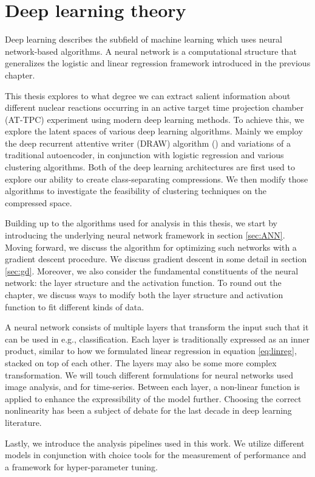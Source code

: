\chapter{Deep learning theory}\label{ch:ml}

Deep learning describes the subfield of machine learning which uses neural network-based algorithms. A neural network is a computational structure that generalizes the logistic and linear regression framework introduced in the previous chapter.

This thesis explores to what degree we can extract salient information about different nuclear reactions occurring in an active target time projection chamber (AT-TPC) experiment using modern deep learning methods. To achieve this, we explore the latent spaces of various deep learning algorithms. Mainly we employ the deep recurrent attentive writer (DRAW) algorithm (\cite{Gregor2015}) and variations of a traditional autoencoder, in conjunction with logistic regression and various clustering algorithms. Both of the deep learning architectures are first used to explore our ability to create class-separating compressions. We then modify those algorithms to investigate the feasibility of clustering techniques on the compressed space. 

Building up to the algorithms used for analysis in this thesis, we start by introducing the underlying neural network framework in section \ref{sec:ANN}. Moving forward, we discuss the algorithm for optimizing such networks with a gradient descent procedure. We discuss gradient descent in some detail in section \ref{sec:gd}. Moreover, we also consider the fundamental constituents of the neural network: the layer structure and the activation function. To round out the chapter, we discuss ways to modify both the layer structure and activation function to fit different kinds of data.

A neural network consists of multiple layers that transform the input such that it can be used in e.g., classification. Each layer is traditionally expressed as an inner product, similar to how we formulated linear regression in equation \ref{eq:linreg}, stacked on top of each other. The layers may also be some more complex transformation. We will touch different formulations for neural networks used image analysis, and for time-series.  Between each layer, a non-linear function is applied to enhance the expressibility of the model further. Choosing the correct nonlinearity has been a subject of debate for the last decade in deep learning literature.

Lastly, we introduce the analysis pipelines used in this work. We utilize different models in conjunction with choice tools for the measurement of performance and a framework for hyper-parameter tuning. 